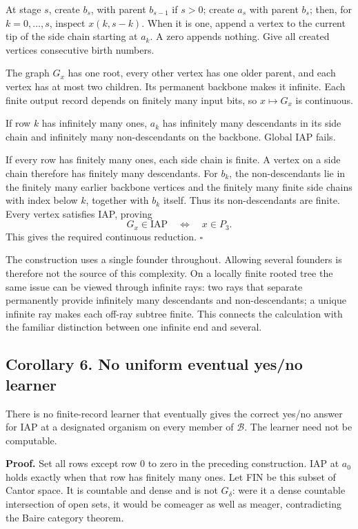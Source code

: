 \documentclass[
  11pt,
  letterpaper,
]{article}
\begin{document}
At stage \(s\), create \(b_s\), with parent \(b_{s-1}\) if \(s>0\);
create \(a_s\) with parent \(b_s\); then, for \(k=0,\ldots,s\), inspect
\(x(k,s-k)\). When it is one, append a vertex to the current tip of the
side chain starting at \(a_k\). A zero appends nothing. Give all created
vertices consecutive birth numbers.

The graph \(G_x\) has one root, every other vertex has one older parent,
and each vertex has at most two children. Its permanent backbone makes
it infinite. Each finite output record depends on finitely many input
bits, so \(x\mapsto G_x\) is continuous.

If row \(k\) has infinitely many ones, \(a_k\) has infinitely many
descendants in its side chain and infinitely many non-descendants on the
backbone. Global IAP fails.

If every row has finitely many ones, each side chain is finite. A vertex
on a side chain therefore has finitely many descendants. For \(b_k\),
the non-descendants lie in the finitely many earlier backbone vertices
and the finitely many finite side chains with index below \(k\),
together with \(b_k\) itself. Thus its non-descendants are finite. Every
vertex satisfies IAP, proving \[
                          G_x\in\mathrm{IAP}
                             \quad\Longleftrightarrow\quad x\in P_3.
\] This gives the required continuous reduction. \hfill\(\square\)

The construction uses a single founder throughout. Allowing several
founders is therefore not the source of this complexity. On a locally
finite rooted tree the same issue can be viewed through infinite rays:
two rays that separate permanently provide infinitely many descendants
and non-descendants; a unique infinite ray makes each off-ray subtree
finite. This connects the calculation with the familiar distinction
between one infinite end and several.

\subsection{Corollary 6. No uniform eventual yes/no
learner}\label{corollary-6.-no-uniform-eventual-yesno-learner}

There is no finite-record learner that eventually gives the correct
yes/no answer for IAP at a designated organism on every member of
\(\mathcal B\). The learner need not be computable.

\textbf{Proof.} Set all rows except row \(0\) to zero in the preceding
construction. IAP at \(a_0\) holds exactly when that row has finitely
many ones. Let FIN be this subset of Cantor space. It is countable and
dense and is not \(G_\delta\): were it a dense countable intersection of
open sets, it would be comeager as well as meager, contradicting the
Baire category theorem.
\end{document}
